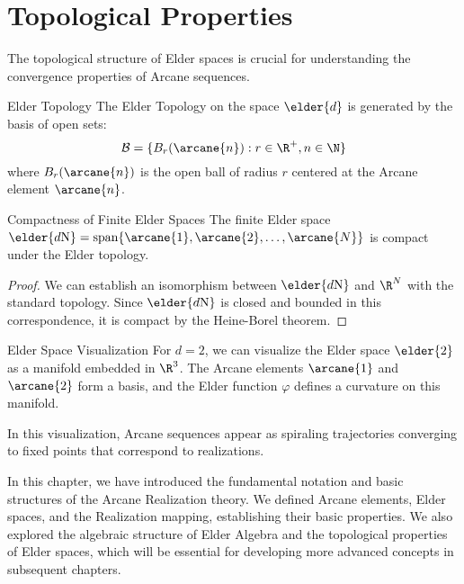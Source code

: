 \section{Topological Properties}

\begin{twocolumnlayout}
The topological structure of Elder spaces is crucial for understanding the convergence properties of Arcane sequences.

\begin{definition}{Elder Topology}{}
The Elder Topology on the space $\elder{d}$ is generated by the basis of open sets:
\begin{equation}
\mathcal{B} = \{B_r(\arcane{n}) : r \in \R^+, n \in \N\}
\end{equation}
where $B_r(\arcane{n})$ is the open ball of radius $r$ centered at the Arcane element $\arcane{n}$.
\end{definition}

\begin{proposition}{Compactness of Finite Elder Spaces}{}
The finite Elder space $\elder{d\mathrm{N}} = \text{span}\{\arcane{1}, \arcane{2}, \ldots, \arcane{N}\}$ is compact under the Elder topology.
\end{proposition}

\begin{proof}
We can establish an isomorphism between $\elder{d\mathrm{N}}$ and $\R^N$ with the standard topology. Since $\elder{d\mathrm{N}}$ is closed and bounded in this correspondence, it is compact by the Heine-Borel theorem.
\end{proof}


\begin{examplebox}{Elder Space Visualization}{}
For $d=2$, we can visualize the Elder space $\elder{2}$ as a manifold embedded in $\R^3$. The Arcane elements $\arcane{1}$ and $\arcane{2}$ form a basis, and the Elder function $\varphi$ defines a curvature on this manifold.

In this visualization, Arcane sequences appear as spiraling trajectories converging to fixed points that correspond to realizations.
\end{examplebox}

\end{twocolumnlayout}

\begin{chaptersummary}
In this chapter, we have introduced the fundamental notation and basic structures of the Arcane Realization theory. We defined Arcane elements, Elder spaces, and the Realization mapping, establishing their basic properties. We also explored the algebraic structure of Elder Algebra and the topological properties of Elder spaces, which will be essential for developing more advanced concepts in subsequent chapters.
\end{chaptersummary}

